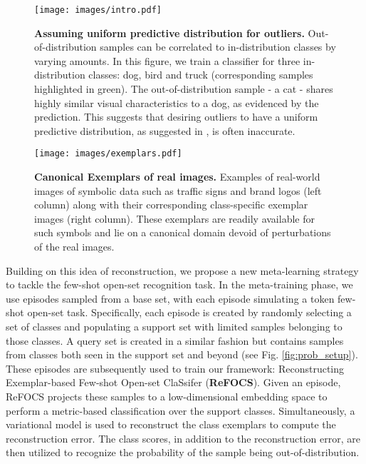 \begin{figure}
    \centering
    \texttt{[image: images/intro.pdf]}
    \caption{\textbf{Assuming uniform predictive distribution for outliers.} Out-of-distribution samples can be correlated to in-distribution classes by varying amounts. In this figure, we train a classifier for three in-distribution classes: dog, bird and truck (corresponding samples highlighted in green). The out-of-distribution sample - a cat - shares highly similar visual characteristics to a dog, as evidenced by the prediction. This suggests that desiring outliers to have a uniform predictive distribution, as suggested in \cite{peeler}, is often inaccurate.} 
    \label{fig:softmax_issues}
\end{figure}

\begin{figure}
    \centering
    \texttt{[image: images/exemplars.pdf]}
    \caption{\textbf{Canonical Exemplars of real images.} Examples of real-world images of symbolic data such as traffic signs and brand logos (left column) along with their corresponding class-specific exemplar images (right column). These exemplars are readily available for such symbols and lie on a canonical domain devoid of perturbations of the real images.}
    \label{fig:exemplar}
\end{figure}

Building on this idea of reconstruction, we propose a new meta-learning strategy to tackle the few-shot open-set recognition task. In the meta-training phase, we use episodes sampled from a base set, with each episode simulating a token few-shot open-set task. Specifically, each episode is created by randomly selecting a set of classes and populating a support set with limited samples belonging to those classes. A query set is created in a similar fashion but contains samples from classes both seen in the support set and beyond (see Fig. \ref{fig:prob_setup}). These episodes are subsequently used to train our framework: Reconstructing Exemplar-based Few-shot Open-set ClaSsifer (\textbf{ReFOCS}). Given an episode, ReFOCS projects these samples to a low-dimensional embedding space to perform a metric-based classification over the support classes. Simultaneously, a variational model is used to reconstruct the class exemplars to compute the reconstruction error. The class scores, in addition to the reconstruction error, are then utilized to recognize the probability of the sample being out-of-distribution.



